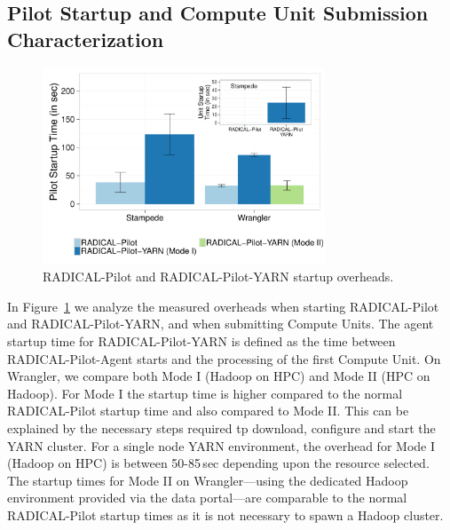 \subsection{Pilot Startup and Compute Unit Submission Characterization}
\label{ssec:startup_pilot_unit}

\begin{figure}[t]
    \centering
    \includegraphics[width=0.75\textwidth]{figures/data_analytics_hpc/hpc_hadoop/pilot_unit_startup.pdf}
    \caption{RADICAL-Pilot and RADICAL-Pilot-YARN startup overheads.
        \label{fig:startup_yarn}}
\end{figure}

In Figure~\ref{fig:startup_yarn} we analyze the measured overheads when starting RADICAL-Pilot and RADICAL-Pilot-YARN, and when submitting Compute Units.
The agent startup time for RADICAL-Pilot-YARN is defined as the time between RADICAL-Pilot-Agent starts and the processing of the first Compute Unit.
On Wrangler, we compare both Mode I (Hadoop on HPC) and Mode II (HPC on Hadoop).
For Mode I the startup time is higher compared to the normal RADICAL-Pilot startup time and also compared to Mode II.
This can be explained by the necessary steps required tp download, configure and start the YARN cluster.
For a single node YARN environment, the overhead for Mode I (Hadoop on HPC) is between 50-85\,sec depending upon the resource selected.
The startup times for Mode II on Wrangler---using the dedicated Hadoop environment provided via the data portal---are comparable to the normal RADICAL-Pilot startup times as it is not necessary to spawn a Hadoop cluster.

